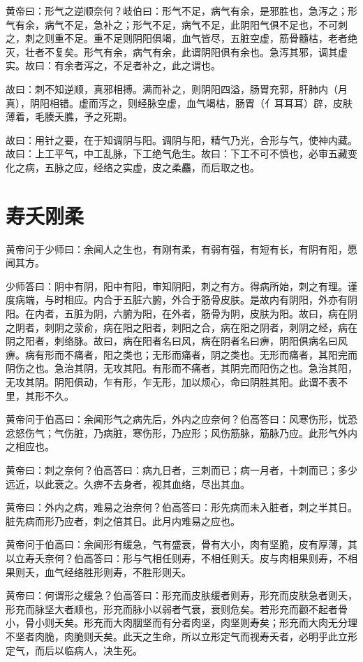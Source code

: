 \documentclass[a4paper,12pt,UTF8,twoside]{ctexbook}
\begin{document}
	黄帝曰：形气之逆顺奈何？岐伯曰：形气不足，病气有余，是邪胜也，急泻之；形气有余，病气不足，急补之；形气不足，病气不足，此阴阳气俱不足也，不可刺之，刺之则重不足。重不足则阴阳俱竭，血气皆尽，五脏空虚，筋骨髓枯，老者绝灭，壮者不复矣。形气有余，病气有余，此谓阴阳俱有余也。急泻其邪，调其虚实。故曰：有余者泻之，不足者补之，此之谓也。
	
	故曰：刺不知逆顺，真邪相搏。满而补之，则阴阳四溢，肠胃充郭，肝肺内（月真），阴阳相错。虚而泻之，则经脉空虚，血气竭枯，肠胃（亻耳耳耳）辟，皮肤薄着，毛腠夭膲，予之死期。
	
	故曰：用针之要，在于知调阴与阳。调阴与阳，精气乃光，合形与气，使神内藏。故曰：上工平气，中工乱脉，下工绝气危生。故曰：下工不可不慎也，必审五藏变化之病，五脉之应，经络之实虚，皮之柔麤，而后取之也。
	
	\chapter{寿夭刚柔}
	
	黄帝问于少师曰：余闻人之生也，有刚有柔，有弱有强，有短有长，有阴有阳，愿闻其方。
	
	少师答曰：阴中有阴，阳中有阳，审知阴阳，刺之有方。得病所始，刺之有理。谨度病端，与时相应。内合于五脏六腑，外合于筋骨皮肤。是故内有阴阳，外亦有阴阳。在内者，五脏为阴，六腑为阳，在外者，筋骨为阴，皮肤为阳。故曰，病在阴之阴者，刺阴之荥俞，病在阳之阳者，刺阳之合，病在阳之阴者，刺阴之经，病在阴之阳者，刺络脉。故曰，病在阳者名曰风，病在阴者名曰痹，阴阳俱病名曰风痹。病有形而不痛者，阳之类也；无形而痛者，阴之类也。无形而痛者，其阳完而阴伤之也。急治其阴，无攻其阳。有形而不痛者，其阴完而阳伤之也。急治其阳，无攻其阴。阴阳俱动，乍有形，乍无形，加以烦心，命曰阴胜其阳。此谓不表不里，其形不久。
	
	黄帝问于伯高曰：余闻形气之病先后，外内之应奈何？伯高答曰：风寒伤形，忧恐忿怒伤气；气伤脏，乃病脏，寒伤形，乃应形；风伤筋脉，筋脉乃应。此形气外内之相应也。
	
	黄帝曰：刺之奈何？伯高答曰：病九日者，三刺而已；病一月者，十刺而已；多少远近，以此衰之。久痹不去身者，视其血络，尽出其血。
	
	黄帝曰：外内之病，难易之治奈何？伯高答曰：形先病而未入脏者，刺之半其日。脏先病而形乃应者，刺之倍其日。此月内难易之应也。
	
	黄帝问于伯高曰：余闻形有缓急，气有盛衰，骨有大小，肉有坚脆，皮有厚薄，其以立寿夭奈何？伯高答曰：形与气相任则寿，不相任则夭。皮与肉相果则寿，不相果则夭，血气经络胜形则寿，不胜形则夭。
	
	黄帝曰：何谓形之缓急？伯高答曰：形充而皮肤缓者则寿，形充而皮肤急者则夭，形充而脉坚大者顺也，形充而脉小以弱者气衰，衰则危矣。若形充而颧不起者骨小，骨小则夭矣。形充而大肉胭坚而有分者肉坚，肉坚则寿矣；形充而大肉无分理不坚者肉脆，肉脆则夭矣。此天之生命，所以立形定气而视寿夭者，必明乎此立形定气，而后以临病人，决生死。
	
\end{document}
